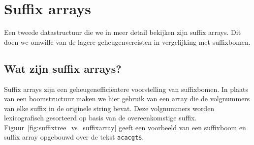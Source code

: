 \chapter{Suffix arrays}\label{ch:suffix-arrays}
Een tweede datastructuur die we in meer detail bekijken zijn suffix arrays.
Dit doen we omwille van de lagere geheugenvereisten in vergelijking met suffixbomen.

\section{Wat zijn suffix arrays?}\label{sec:wat-zijn-suffix-arrays?}
Suffix arrays zijn een geheugenefficiëntere voorstelling van suffixbomen.
In plaats van een boomstructuur maken we hier gebruik van een array die de volgnummers van elke suffix in de originele string bevat.
Deze volgnummers worden lexicografisch gesorteerd op basis van de overeenkomstige suffix.
Figuur~\ref{fig:suffixtree_vs_suffixarray} geeft een voorbeeld van een suffixboom en suffix array opgebouwd over de tekst \texttt{acacgt\$}.

